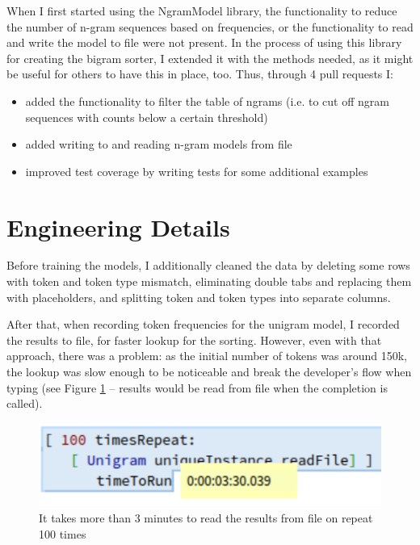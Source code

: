 When I first started using the NgramModel library, the functionality to reduce the number of n-gram sequences based on frequencies, or the functionality to read and write the model to file were not present. In the process of using this library for creating the bigram sorter, I extended it with the methods needed, as it might be useful for others to have this in place, too. Thus, through 4 pull requests I:
\begin{itemize}
    \item added the functionality to filter the table of ngrams (i.e. to cut off ngram sequences with counts below a certain threshold)
    \item added writing to and reading n-gram models from file
    \item improved test coverage by writing tests for some additional examples
\end{itemize}

\section{Engineering Details}
\label{sec:ProposedSolution-Engineering}
Before training the models, I additionally cleaned the data by deleting some rows with token and token type mismatch, eliminating double tabs and replacing them with placeholders, and splitting token and token types into separate columns.

After that, when recording token frequencies for the unigram model, I recorded the results to file, for faster lookup for the sorting. However, even with that approach, there was a problem: as the initial number of tokens was around 150k, the lookup was slow enough to be noticeable and break the developer's flow when typing (see Figure \ref{fig:sorterSlow} -- results would be read from file when the completion is called).

\begin{figure}[H]
    \centering
    \includegraphics[width=0.9\linewidth]{images/unigramTimeToRunSlow.png}
    \caption{It takes more than 3 minutes to read the results from file on repeat 100 times}
    \label{fig:sorterSlow}
\end{figure}

